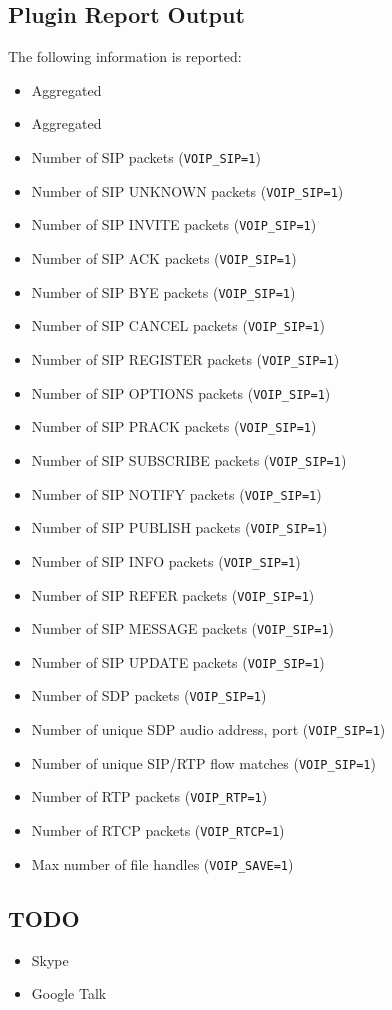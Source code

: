 \documentclass[documentation]{subfiles}
\begin{document}
\subsection{Plugin Report Output}
The following information is reported:
\begin{itemize}
    \item Aggregated {\tt{}}
    \item Aggregated {\tt{}}
    \item Number of SIP packets ({\tt VOIP\_SIP=1})
    \item Number of SIP UNKNOWN packets ({\tt VOIP\_SIP=1})
    \item Number of SIP INVITE packets ({\tt VOIP\_SIP=1})
    \item Number of SIP ACK packets ({\tt VOIP\_SIP=1})
    \item Number of SIP BYE packets ({\tt VOIP\_SIP=1})
    \item Number of SIP CANCEL packets ({\tt VOIP\_SIP=1})
    \item Number of SIP REGISTER packets ({\tt VOIP\_SIP=1})
    \item Number of SIP OPTIONS packets ({\tt VOIP\_SIP=1})
    \item Number of SIP PRACK packets ({\tt VOIP\_SIP=1})
    \item Number of SIP SUBSCRIBE packets ({\tt VOIP\_SIP=1})
    \item Number of SIP NOTIFY packets ({\tt VOIP\_SIP=1})
    \item Number of SIP PUBLISH packets ({\tt VOIP\_SIP=1})
    \item Number of SIP INFO packets ({\tt VOIP\_SIP=1})
    \item Number of SIP REFER packets ({\tt VOIP\_SIP=1})
    \item Number of SIP MESSAGE packets ({\tt VOIP\_SIP=1})
    \item Number of SIP UPDATE packets ({\tt VOIP\_SIP=1})
    \item Number of SDP packets ({\tt VOIP\_SIP=1})
    \item Number of unique SDP audio address, port ({\tt VOIP\_SIP=1})
    \item Number of unique SIP/RTP flow matches ({\tt VOIP\_SIP=1})
    \item Number of RTP packets ({\tt VOIP\_RTP=1})
    \item Number of RTCP packets ({\tt VOIP\_RTCP=1})
    \item Max number of file handles ({\tt VOIP\_SAVE=1})
\end{itemize}

\subsection{TODO}

\begin{itemize}
    \item Skype
    \item Google Talk
\end{itemize}
\end{document}
